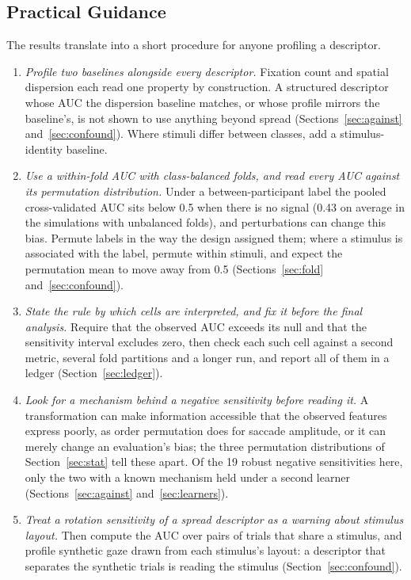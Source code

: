 \documentclass[man,floatsintext,12pt]{apa7}
\begin{document}
\subsection{Practical Guidance}\label{sec:guide}
The results translate into a short procedure for anyone profiling a descriptor.
\begin{enumerate}
\item \emph{Profile two baselines alongside every descriptor.} Fixation count and spatial dispersion each read one property by construction. A structured descriptor whose AUC the dispersion baseline matches, or whose profile mirrors the baseline's, is not shown to use anything beyond spread (Sections~\ref{sec:against} and~\ref{sec:confound}). Where stimuli differ between classes, add a stimulus-identity baseline.
\item \emph{Use a within-fold AUC with class-balanced folds, and read every AUC against its permutation distribution.} Under a between-participant label the pooled cross-validated AUC sits below 0.5 when there is no signal (0.43 on average in the simulations with unbalanced folds), and perturbations can change this bias. Permute labels in the way the design assigned them; where a stimulus is associated with the label, permute within stimuli, and expect the permutation mean to move away from 0.5 (Sections~\ref{sec:fold} and~\ref{sec:confound}).
\item \emph{State the rule by which cells are interpreted, and fix it before the final analysis.} Require that the observed AUC exceeds its null and that the sensitivity interval excludes zero, then check each such cell against a second metric, several fold partitions and a longer run, and report all of them in a ledger (Section~\ref{sec:ledger}).
\item \emph{Look for a mechanism behind a negative sensitivity before reading it.} A transformation can make information accessible that the observed features express poorly, as order permutation does for saccade amplitude, or it can merely change an evaluation's bias; the three permutation distributions of Section~\ref{sec:stat} tell these apart. Of the 19 robust negative sensitivities here, only the two with a known mechanism held under a second learner (Sections~\ref{sec:against} and~\ref{sec:learners}).
\item \emph{Treat a rotation sensitivity of a spread descriptor as a warning about stimulus layout.} Then compute the AUC over pairs of trials that share a stimulus, and profile synthetic gaze drawn from each stimulus's layout: a descriptor that separates the synthetic trials is reading the stimulus (Section~\ref{sec:confound}).

\end{enumerate}
\end{document}
